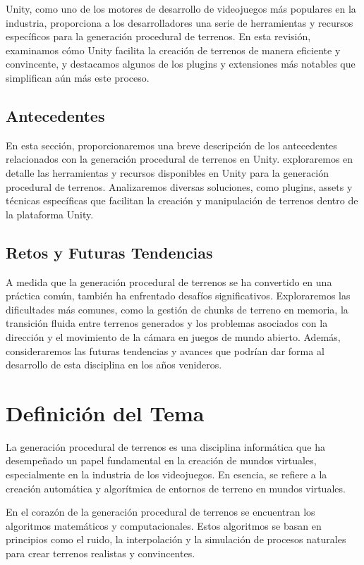 Unity, como uno de los motores de desarrollo de videojuegos más populares en la industria, proporciona a los desarrolladores una serie de herramientas y recursos específicos para la generación procedural de terrenos. En esta revisión, examinamos cómo Unity facilita la creación de terrenos de manera eficiente y convincente, y destacamos algunos de los plugins y extensiones más notables que simplifican aún más este proceso.

\subsection{Antecedentes}

En esta sección, proporcionaremos una breve descripción de los antecedentes relacionados con la generación procedural de terrenos en Unity. exploraremos en detalle las herramientas y recursos disponibles en Unity para la generación procedural de terrenos. Analizaremos diversas soluciones, como plugins, assets y técnicas específicas que facilitan la creación y manipulación de terrenos dentro de la plataforma Unity.

\subsection{Retos y Futuras Tendencias}

A medida que la generación procedural de terrenos se ha convertido en una práctica común, también ha enfrentado desafíos significativos. Exploraremos las dificultades más comunes, como la gestión de chunks de terreno en memoria, la transición fluida entre terrenos generados y los problemas asociados con la dirección y el movimiento de la cámara en juegos de mundo abierto. Además, consideraremos las futuras tendencias y avances que podrían dar forma al desarrollo de esta disciplina en los años venideros. 


\section{Definición del Tema}

La generación procedural de terrenos es una disciplina informática que ha desempeñado un papel fundamental en la creación de mundos virtuales, especialmente en la industria de los videojuegos. En esencia, se refiere a la creación automática y algorítmica de entornos de terreno en mundos virtuales.

En el corazón de la generación procedural de terrenos se encuentran los algoritmos matemáticos y computacionales. Estos algoritmos se basan en principios como el ruido, la interpolación y la simulación de procesos naturales para crear terrenos realistas y convincentes.

